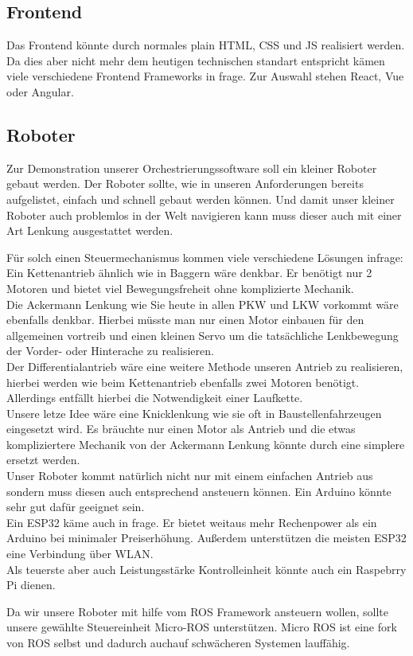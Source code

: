 \subsection{Frontend}
    Das Frontend könnte durch normales plain HTML, CSS und JS realisiert werden. 
    Da dies aber nicht mehr dem heutigen technischen standart entspricht kämen viele verschiedene Frontend Frameworks in frage.
    Zur Auswahl stehen React, Vue oder Angular.

\subsection{Roboter}
    Zur Demonstration unserer Orchestrierungssoftware soll ein kleiner Roboter gebaut werden.
    Der Roboter sollte, wie in unseren Anforderungen bereits aufgelistet, einfach und schnell gebaut werden können.
    Und damit unser kleiner Roboter auch problemlos in der Welt navigieren kann muss dieser auch mit einer Art Lenkung ausgestattet werden.

    Für solch einen Steuermechanismus kommen viele verschiedene Lösungen infrage:
    \\
    Ein Kettenantrieb ähnlich wie in Baggern wäre denkbar. Er benötigt nur 2 Motoren und bietet viel Bewegungsfreheit ohne komplizierte Mechanik. 
    \\
    Die Ackermann Lenkung wie Sie heute in allen PKW und LKW vorkommt wäre ebenfalls denkbar. Hierbei müsste man 
    nur einen Motor einbauen für den allgemeinen vortreib und einen kleinen Servo um die tatsächliche Lenkbewegung der
    Vorder- oder Hinterache zu realisieren. 
    \\
    Der Differentialantrieb wäre eine weitere Methode unseren Antrieb zu realisieren, hierbei werden wie beim Kettenantrieb
    ebenfalls zwei Motoren benötigt. Allerdings entfällt hierbei die Notwendigkeit einer Laufkette.
    \\
    Unsere letze Idee wäre eine Knicklenkung wie sie oft in Baustellenfahrzeugen eingesetzt wird. Es bräuchte nur einen Motor
    als Antrieb und die etwas kompliziertere Mechanik von der Ackermann Lenkung könnte durch eine simplere ersetzt werden.
    \\

    Unser Roboter kommt natürlich nicht nur mit einem einfachen Antrieb aus sondern muss diesen auch entsprechend 
    ansteuern können.
    Ein Arduino könnte sehr gut dafür geeignet sein.
    \\
    Ein ESP32 käme auch in frage. Er bietet weitaus mehr Rechenpower als ein Arduino bei minimaler Preiserhöhung.
    Außerdem unterstützen die meisten ESP32 eine Verbindung über WLAN.
    \\
    Als teuerste aber auch Leistungsstärke Kontrolleinheit könnte auch ein Raspebrry Pi dienen.
    
    Da wir unsere Roboter mit hilfe vom ROS Framework ansteuern wollen, sollte unsere gewählte Steuereinheit Micro-ROS unterstützen.
    Micro ROS ist eine fork von ROS selbst und dadurch auchauf schwächeren Systemen lauffähig.